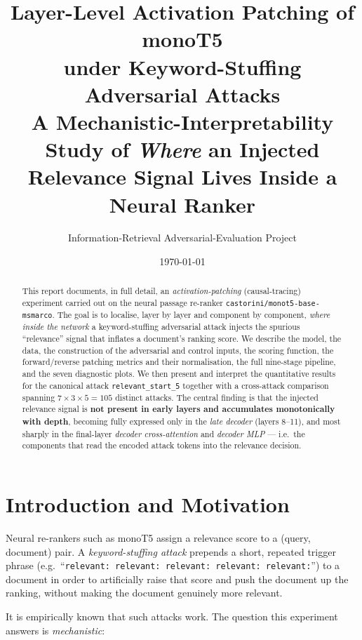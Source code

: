 \documentclass[11pt]{article}
\title{\textbf{Layer-Level Activation Patching of monoT5 \\[2pt]
under Keyword-Stuffing Adversarial Attacks} \\[6pt]
\large A Mechanistic-Interpretability Study of \emph{Where} an Injected
Relevance Signal Lives Inside a Neural Ranker}
\author{Information-Retrieval Adversarial-Evaluation Project}
\date{\today}
\begin{document}
\maketitle

\begin{abstract}
This report documents, in full detail, an \emph{activation-patching}
(causal-tracing) experiment carried out on the neural passage re-ranker
\texttt{castorini/monot5-base-msmarco}. The goal is to localise, layer by layer
and component by component, \emph{where inside the network} a keyword-stuffing
adversarial attack injects the spurious ``relevance'' signal that inflates a
document's ranking score. We describe the model, the data, the construction of
the adversarial and control inputs, the scoring function, the forward/reverse
patching metrics and their normalisation, the full nine-stage pipeline, and the
seven diagnostic plots. We then present and interpret the quantitative results
for the canonical attack \texttt{relevant\_start\_5} together with a cross-attack
comparison spanning $7\times3\times5 = 105$ distinct attacks. The central finding
is that the injected relevance signal is \textbf{not present in early layers and
accumulates monotonically with depth}, becoming fully expressed only in the
\emph{late decoder} (layers 8--11), and most sharply in the final-layer
\emph{decoder cross-attention} and \emph{decoder MLP} — i.e.\ the components that
read the encoded attack tokens into the relevance decision.
\end{abstract}

\tableofcontents
\newpage

\section{Introduction and Motivation}

Neural re-rankers such as monoT5 assign a relevance score to a
(query, document) pair. A \emph{keyword-stuffing attack} prepends a short,
repeated trigger phrase (e.g.\ ``\texttt{relevant: relevant: relevant: relevant:
relevant:}'') to a document in order to artificially raise that score and push
the document up the ranking, without making the document genuinely more relevant.

It is empirically known that such attacks work. The question this experiment
answers is \emph{mechanistic}:
\end{document}
